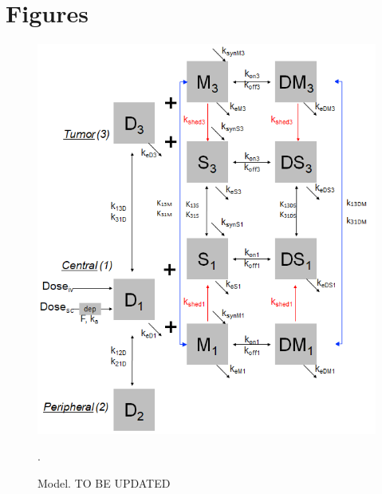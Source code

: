 \section*{Figures}

\begin{figure}[h]
\centering
\includegraphics[scale=0.45]{figures/3compartment_shed_traffic.png}
\caption{Model.  TO BE UPDATED \label{fig:model}}.
\end{figure}